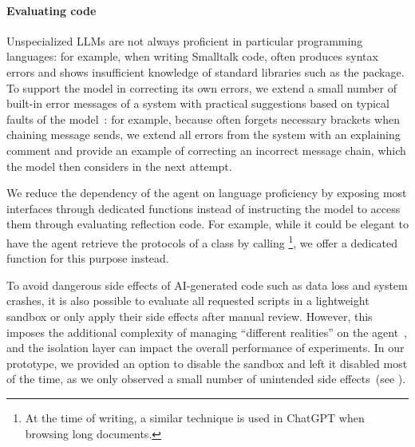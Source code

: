 \paragraph{Evaluating code}
Unspecialized LLMs are not always proficient in particular programming languages:
for example, when writing Smalltalk code, \gptfouro often produces syntax errors and shows insufficient knowledge of standard libraries such as the  package.
To support the model in correcting its own errors, we extend a small number of built-in error messages of a system with practical suggestions based on typical faults of the model~\cite{traver2010compiler}:
for example, because \gptfouro often forgets necessary brackets when chaining message sends, we extend all  errors from the system with an explaining comment and provide an example of correcting an incorrect message chain, which the model then considers in the next attempt.

We reduce the dependency of the agent on language proficiency by exposing most interfaces through dedicated functions instead of instructing the model to access them through evaluating reflection code.
For example, while it could be elegant to have the agent retrieve the protocols of a class by calling \footnote{
	At the time of writing, a similar technique is used in ChatGPT when browsing long documents.
}, we offer a dedicated  function for this purpose instead.

To avoid dangerous side effects of AI-generated code such as data loss and system crashes, it is also possible to evaluate all requested scripts in a lightweight sandbox or only apply their side effects after manual review.
However, this imposes the additional complexity of managing ``different realities'' on the agent~\cite{rehwaldt2012exploring}, and the isolation layer can impact the overall performance of experiments.
In our prototype, we provided an option to disable the sandbox and left it disabled most of the time, as we only observed a small number of unintended side effects~(see ).
